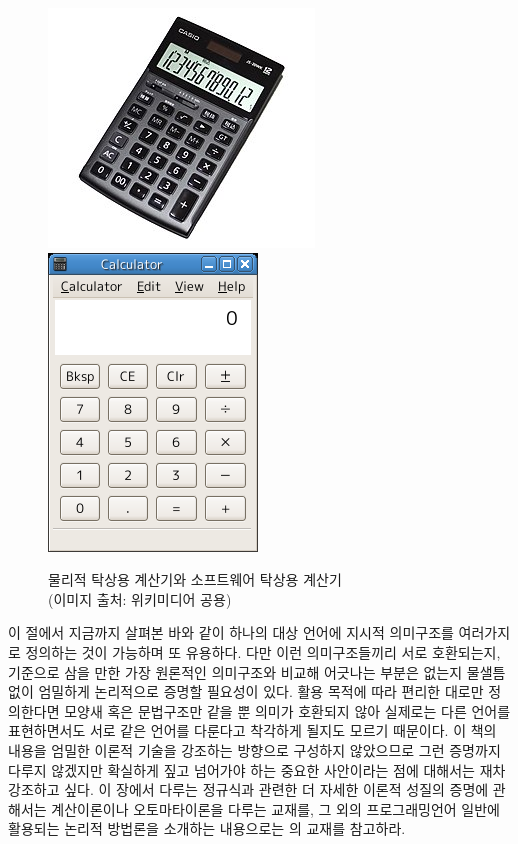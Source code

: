 \documentclass[b5paper,chapter,figtabcapt]{oblivoir}
\begin{document}
\begin{figure}\centering
\includegraphics[scale=.4]{DeskCalculator.jpg}\qquad
\includegraphics[trim={0 20pt 0 0},clip,scale=.3]{Gcalc.png}\qquad\qquad
\caption{물리적 탁상용 계산기와 소프트웨어 탁상용 계산기\\
         {\scriptsize(이미지 출처: 위키미디어 공용)}}
\end{figure}

이 절에서 지금까지 살펴본 바와 같이 하나의 대상 언어에 지시적 의미구조를
여러가지로 정의하는 것이 가능하며 또 유용하다. 다만 이런 의미구조들끼리
서로 호환되는지, 기준으로 삼을 만한 가장 원론적인 의미구조와 비교해
어긋나는 부분은 없는지 물샐틈없이 엄밀하게 논리적으로 증명할 필요성이 있다.
활용 목적에 따라 편리한 대로만 정의한다면 모양새 혹은
문법구조만 같을 뿐 의미가 호환되지 않아 실제로는 다른 언어를 표현하면서도
서로 같은 언어를 다룬다고 착각하게 될지도 모르기 때문이다. 이 책의 내용을
엄밀한 이론적 기술을 강조하는 방향으로 구성하지 않았으므로 그런 증명까지
다루지 않겠지만 확실하게 짚고 넘어가야 하는 중요한 사안이라는 점에 대해서는
재차 강조하고 싶다. 이 장에서 다루는 정규식과 관련한 더 자세한 이론적
성질의 증명에 관해서는 계산이론이나 오토마타이론을 다루는
교재\cite{Sipser2013,Hopcroft2007}를, 그 외의 프로그래밍언어 일반에
활용되는 논리적 방법론을 소개하는 내용으로는 \citet{PFPL2nd}의 교재를
참고하라.
\end{document}
